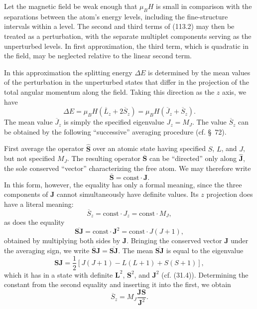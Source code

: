 Let the magnetic field be weak enough that $\mu_BH$ is small in comparison with the separations between the atom's energy levels, including the fine-structure intervals within a level. The second and third terms of (113.2) may then be treated as a perturbation, with the separate multiplet components serving as the unperturbed levels. In first approximation, the third term, which is quadratic in the field, may be neglected relative to the linear second term.

In this approximation the splitting energy $\Delta E$ is determined by the mean values of the perturbation in the unperturbed states that differ in the projection of the total angular momentum along the field. Taking this direction as the $z$ axis, we have
\begin{equation}
 \Delta E=\mu_BH(\overline L_z+2\overline S_z)=\mu_BH(\overline J_z+\overline S_z).
 \tag{113.4}
\end{equation}
The mean value $\overline J_z$ is simply the specified eigenvalue $J_z=M_J$. The value $\overline S_z$ can be obtained by the following ``successive'' averaging procedure (cf. §~72).

First average the operator $\hat{\mathbf S}$ over an atomic state having specified $S$, $L$, and $J$, but not specified $M_J$. The resulting operator $\overline{\mathbf S}$ can be ``directed'' only along $\hat{\mathbf J}$, the sole conserved ``vector'' characterizing the free atom. We may therefore write
\[
 \overline{\mathbf S}=\mathrm{const}\cdot\mathbf J.
\]
In this form, however, the equality has only a formal meaning, since the three components of $\mathbf J$ cannot simultaneously have definite values. Its $z$ projection does have a literal meaning:
\[
 \overline S_z=\mathrm{const}\cdot J_z=\mathrm{const}\cdot M_J,
\]
as does the equality
\[
 \overline{\mathbf S\mathbf J}=\mathrm{const}\cdot\mathbf J^2=\mathrm{const}\cdot J(J+1),
\]
obtained by multiplying both sides by $\mathbf J$. Bringing the conserved vector $\mathbf J$ under the averaging sign, we write $\overline{\mathbf S}\mathbf J=\overline{\mathbf S\mathbf J}$. The mean $\overline{\mathbf S\mathbf J}$ is equal to the eigenvalue
\[
 \mathbf S\mathbf J=\frac12[J(J+1)-L(L+1)+S(S+1)],
\]
which it has in a state with definite $\mathbf L^2$, $\mathbf S^2$, and $\mathbf J^2$ (cf. (31.4)). Determining the constant from the second equality and inserting it into the first, we obtain
\begin{equation}
 \overline S_z=M_J\frac{\mathbf J\mathbf S}{\mathbf J^2}.
 \tag{113.5}
\end{equation}

